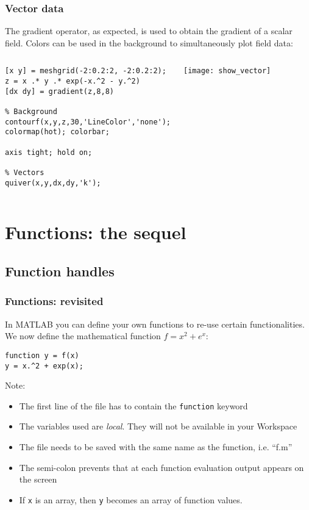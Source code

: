 \begin{frame}[fragile]
  \frametitle{Vector data}
  The gradient operator, as expected, is used to obtain the gradient of a scalar field. Colors can be used in the background to simultaneously plot field data:
  \begin{columns}[T]
    \begin{lstlisting}
[x y] = meshgrid(-2:0.2:2, -2:0.2:2);
z = x .* y .* exp(-x.^2 - y.^2)
[dx dy] = gradient(z,8,8)

% Background
contourf(x,y,z,30,'LineColor','none');
colormap(hot); colorbar;

axis tight; hold on;

% Vectors
quiver(x,y,dx,dy,'k');
    \end{lstlisting}
   \begin{center}
      \texttt{[image: show\_vector]}
    \end{center}
  \end{columns}
\end{frame}

\section{Functions: the sequel}
\subsection*{Function handles}
\begin{frame}[fragile]
  \frametitle{Functions: revisited}
  In MATLAB you can define your own functions to re-use certain functionalities. We now define the mathematical function $f = x^2+e^x$:
  \begin{lstlisting}
function y = f(x)
y = x.^2 + exp(x);
  \end{lstlisting}
  \pause
  Note:
  \begin{itemize}
    \item The first line of the file has to contain the \lstinline$function$ keyword
    \item The variables used are \emph{local}. They will not be available in your Workspace
    \item The file needs to be saved with the same name as the function, i.e. ``f.m''
    \item The semi-colon prevents that at each function evaluation output appears on the screen
    \item If \lstinline$x$ is an array, then \lstinline$y$ becomes an array of function values.
  \end{itemize}
\end{frame}

